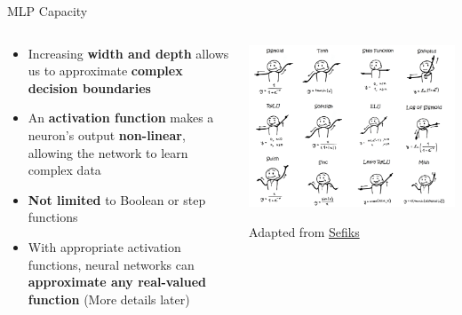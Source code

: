 \documentclass[serif, aspectratio=169]{beamer}
\begin{document}
\begin{frame}{MLP Capacity}
    \begin{columns}
        \begin{column}{0.6\textwidth}
            \begin{itemize}
                \item Increasing \textbf{width and depth} allows us to approximate \textbf{complex decision boundaries}
                \item An \textbf{activation function} makes a neuron’s output \textbf{non-linear}, allowing the network to learn complex data
                \item \textbf{Not limited} to Boolean or step functions
                \item With appropriate activation functions, neural networks can \textbf{approximate any real-valued function} (More details later)
            \end{itemize}
        \end{column}
        \begin{column}{0.4\textwidth}
            \includegraphics[width=\textwidth]{pic/2/activations.png} \\
            \begin{center}
            {\scriptsize Adapted from \href{https://sefiks.com/2020/02/02/dance-moves-of-deep-learning-activation-functions/}{Sefiks}}
            \end{center}
        \end{column}
    \end{columns}
\end{frame}
\end{document}
